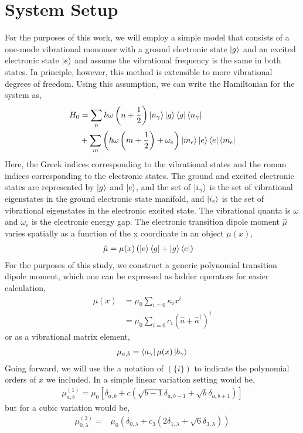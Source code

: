 \section{System Setup}
For the purposes of this work, we will employ a simple model that consists of a one-mode vibrational monomer with a ground electronic state $\ket{g}$ and an excited electronic state $\ket{e}$ and assume the vibrational frequency is the same in both states.  In principle, however, this method is extensible to more vibrational degrees of freedom.  Using this assumption, we can write the Hamiltonian for the system as,
\begin{align}
	H_0 &=  \sum_n \hbar \omega \left(n + \frac{1}{2} \right)  \ket{n_{\gamma}}\ket{g}\bra{g} \bra{n_{\gamma}} \\
   &+ \sum_m \left(  \hbar \omega  \left(m + \frac{1}{2} \right) + \omega_e \right)  \ket{m_{\epsilon}} \ket{e}\bra{e} \bra{m_{\epsilon}}
\end{align}
Here, the Greek indices corresponding to the vibrational states and the roman indices corresponding to the electronic states.  The ground and excited electronic states are represented by $\ket{g}$ and $\ket{e}$, and the set of $\ket{i_{\gamma}}$ is the set of vibrational eigenstates in the ground electronic state manifold, and $\ket{i_{\epsilon}}$ is the set of vibrational eigenstates in the electronic excited state.  The vibrational quanta is $\omega$ and $\omega_e$ is the electronic energy gap.  The electronic transition  dipole moment $\hat{\mu}$ varies spatially as a function of the x coordinate in an object $\mu(x)$,
\begin{align}
	\hat{\mu} &= \mu (x)  \left( \ket{e}\bra{g} + \ket{g} \bra{e} \right)
\end{align}
For the purposes of this study, we construct a generic polynomial transition dipole moment, which one can be expressed as ladder operators for easier calculation,
\begin{align}
	\mu(x) &= \mu_0 \sum_{i=0} \kappa_i x^i \\
	&= \mu_0 \sum_{i=0} c_i \left( \hat{a} + \hat{a}^{\dagger}\right)^i
\end{align}
or as a vibrational matrix element,
\begin{align}
	\mu_{a,b} = \bra{a_{\gamma}} \mu(x) \ket{b_{\gamma}}
\end{align}
Going forward, we will use the a notation of $(\{i\})$ to indicate the polynomial orders of $x$ we included.  In a simple linear variation setting would be,
\begin{align}
	\mu^{(1)}_{a,b} = \mu_0 \left[ \delta_{a,b} + c \left( \sqrt{b-1}\delta_{a,b-1} + \sqrt{b}\delta_{a,b+1}\right) \right]
\end{align}
but for a cubic variation would be,
\begin{align*}
	\mu^{(3)}_{0,\lambda} =& \mu_0 \left( \delta_{0,\lambda}  + c_3   \left(2\delta_{1,\lambda}  +\sqrt{6}\delta_{3,\lambda} \right)\right)
\end{align*}


